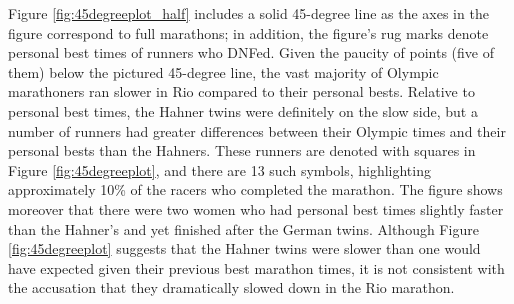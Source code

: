 \documentclass[12pt,titlepage]{article}
\begin{document}
Figure \ref{fig:45degreeplot_half} includes a solid 45-degree line as
the axes in the figure correspond to full marathons; in addition, the
figure's rug marks denote personal best times of runners who DNFed.
Given the paucity of points (five of them) below the pictured
45-degree line, the vast majority of Olympic marathoners ran slower in
Rio compared to their personal bests.  Relative to personal best
times, the Hahner twins were definitely on the slow side, but a number
of runners had greater differences between their Olympic times and
their personal bests than the Hahners.  These runners are denoted with
squares in Figure \ref{fig:45degreeplot}, and there are 13 such
symbols, highlighting approximately 10\% of the racers who completed
the marathon.  The figure shows moreover that there were two women who
had personal best times slightly faster than the Hahner's and yet
finished after the German twins.  Although Figure
\ref{fig:45degreeplot} suggests that the Hahner twins were slower than
one would have expected given their previous best marathon times, it
is not consistent with the accusation that they dramatically slowed
down in the Rio marathon.

\end{document}
